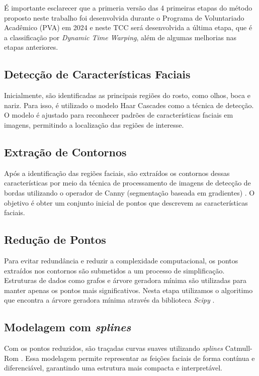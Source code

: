 É importante esclarecer que a primeria versão das 4 primeiras etapas do método proposto neste trabalho foi desenvolvida durante o Programa de Voluntariado Acadêmico (PVA) em 2024 e neste TCC será desenvolvida a última etapa, que é a classificação por \textit{Dynamic Time Warping}, além de algumas melhorias nas etapas anteriores.

\subsection{Detecção de Características Faciais}

Inicialmente, são identificadas as principais regiões do rosto, como olhos, boca e nariz. Para isso, é utilizado o modelo Haar Cascades \cite{BoostedCascade, HaarAplicacao} como a técnica de detecção. O modelo é ajustado para reconhecer padrões de características faciais em imagens, permitindo a localização das regiões de interesse.

\subsection{Extração de Contornos} 

Após a identificação das regiões faciais, são extraídos os contornos dessas características por meio da técnica de processamento de imagens de detecção de bordas utilizando o operador de Canny (segmentação baseada em gradientes) \cite{Canny,CannyAplicacao}. O objetivo é obter um conjunto inicial de pontos que descrevem as características faciais.

\subsection{Redução de Pontos}

Para evitar redundância e reduzir a complexidade computacional, os pontos extraídos nos contornos são submetidos a um processo de simplificação. Estruturas de dados como grafos e árvore geradora mínima são utilizadas para manter apenas os pontos mais significativos. Nesta etapa utilizamos o algoritimo que encontra a árvore geradora mínima através da biblioteca \textit{Scipy} \cite{Scipy}.

\subsection{Modelagem com \textit{splines}}

Com os pontos reduzidos, são traçadas curvas suaves utilizando \textit{splines} Catmull-Rom \cite{CatmullRom, CatRomDemonstration, RepresentationSplines}. Essa modelagem permite representar as feições faciais de forma contínua e diferenciável, garantindo uma estrutura mais compacta e interpretável.

